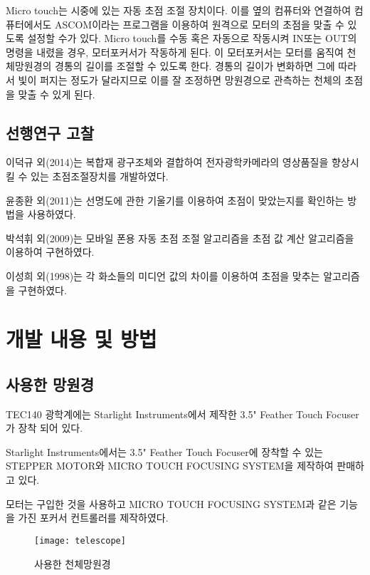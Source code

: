 \documentclass{abstract_hutech}
\begin{document}
Micro touch는 시중에 있는 자동 초점 조절 장치이다. 이를 옆의 컴퓨터와 연결하여 컴퓨터에서도 ASCOM이라는 프로그램을 이용하여 원격으로 모터의 초점을 맞출 수 있도록 설정할 수가 있다. Micro touch를 수동 혹은 자동으로 작동시켜 IN또는 OUT의 명령을 내렸을 경우, 모터포커서가 작동하게 된다. 이 모터포커서는 모터를 움직여 천체망원경의 경통의 길이를 조절할 수 있도록 한다. 경통의 길이가 변화하면 그에 따라서 빛이 퍼지는 정도가 달라지므로 이를 잘 조정하면 망원경으로 관측하는 천체의 초점을 맞출 수 있게 된다.

\subsection{선행연구 고찰}

이덕규 외(2014)는 복합재 광구조체와 결합하여 전자광학카메라의 영상품질을 향상시킬 수 있는 초점조절장치를 개발하였다.\cite{leedukgu2014}

윤종환 외(2011)는 선명도에 관한 기울기를 이용하여 초점이 맞았는지를 확인하는 방법을 사용하였다.\cite{yunjonghwan2011lcd}

박석휘 외(2009)는 모바일 폰용 자동 초점 조절 알고리즘을 초점 값 계산 알고리즘을 이용하여 구현하였다.\cite{parksukhui2009Median}

이성희 외(1998)는 각 화소들의 미디언 값의 차이를 이용하여 초점을 맞추는 알고리즘을 구현하였다.\cite{leeseonghee1998Median}


\section{개발 내용 및 방법}

\subsection{사용한 망원경}

TEC140 광학계에는 Starlight Instruments에서 제작한 3.5" Feather Touch Focuser가 장착 되어 있다. 

Starlight Instruments에서는 3.5" Feather Touch Focuser에 장착할 수 있는 STEPPER MOTOR와 MICRO TOUCH FOCUSING SYSTEM을 제작하여 판매하고 있다. 

모터는 구입한 것을 사용하고 MICRO TOUCH FOCUSING SYSTEM과 같은 기능을 가진 포커서 컨트롤러를 제작하였다.
\begin{figure}[h]
	\centering
	\texttt{[image: telescope]}
	\caption{사용한 천체망원경}
	\label{fig:telescope}
\end{figure}
\end{document}
